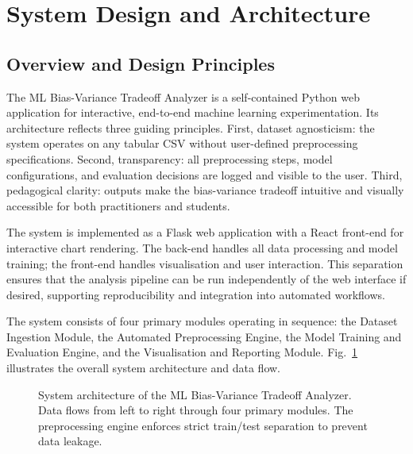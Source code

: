 \documentclass[conference]{IEEEtran}
\begin{document}
\section{System Design and Architecture}

\subsection{Overview and Design Principles}

The ML Bias-Variance Tradeoff Analyzer is a self-contained Python web application for interactive, end-to-end machine learning experimentation. Its architecture reflects three guiding principles. First, dataset agnosticism: the system operates on any tabular CSV without user-defined preprocessing specifications. Second, transparency: all preprocessing steps, model configurations, and evaluation decisions are logged and visible to the user. Third, pedagogical clarity: outputs make the bias-variance tradeoff intuitive and visually accessible for both practitioners and students.

The system is implemented as a Flask web application with a React front-end for interactive chart rendering. The back-end handles all data processing and model training; the front-end handles visualisation and user interaction. This separation ensures that the analysis pipeline can be run independently of the web interface if desired, supporting reproducibility and integration into automated workflows.

The system consists of four primary modules operating in sequence: the Dataset Ingestion Module, the Automated Preprocessing Engine, the Model Training and Evaluation Engine, and the Visualisation and Reporting Module. Fig.~\ref{fig:architecture} illustrates the overall system architecture and data flow.

\begin{figure}[t]
    \centering
    \caption{System architecture of the ML Bias-Variance Tradeoff Analyzer. Data flows from left to right through four primary modules. The preprocessing engine enforces strict train/test separation to prevent data leakage.}
    \label{fig:architecture}
\end{figure}
\end{document}

